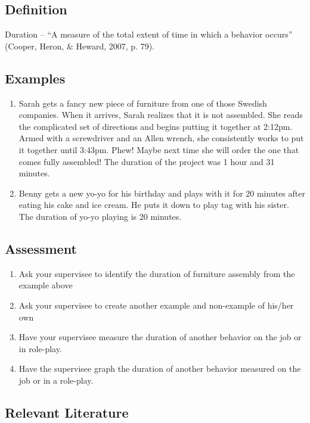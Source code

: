\subsection{Definition}
Duration – ``A measure of the total extent of time in which a behavior occurs'' (Cooper, Heron, \& Heward, 2007, p. 79).
%
\subsection{Examples}
\begin{enumerate}
\item Sarah gets a fancy new piece of furniture from one of those Swedish companies.  When it arrives, Sarah realizes that it is not assembled.  She reads the complicated set of directions and begins putting it together at 2:12pm. Armed with a screwdriver and an Allen wrench, she consistently works to put it together until 3:43pm. Phew! Maybe next time she will order the one that comes fully assembled! The duration of the project was 1 hour and 31 minutes.
\item Benny gets a new yo-yo for his birthday and plays with it for 20 minutes after eating his cake and ice cream. He puts it down to play tag with his sister. The duration of yo-yo playing is 20 minutes.
\end{enumerate}
%
\subsection{Assessment}
\begin{enumerate}
\item Ask your supervisee to identify the duration of furniture assembly from the example above
\item Ask your supervisee to create another example and non-example of his/her own
\item Have your supervisee measure the duration of another behavior on the job or in role-play.
\item Have the supervisee graph the duration of another behavior measured on the job or in a role-play.
\end{enumerate}
%
\subsection{Relevant Literature}
\begin{refsection}
\nocite{cooper2007applied,deleon1999examination}
\printbibliography[heading=none]
\end{refsection}%


